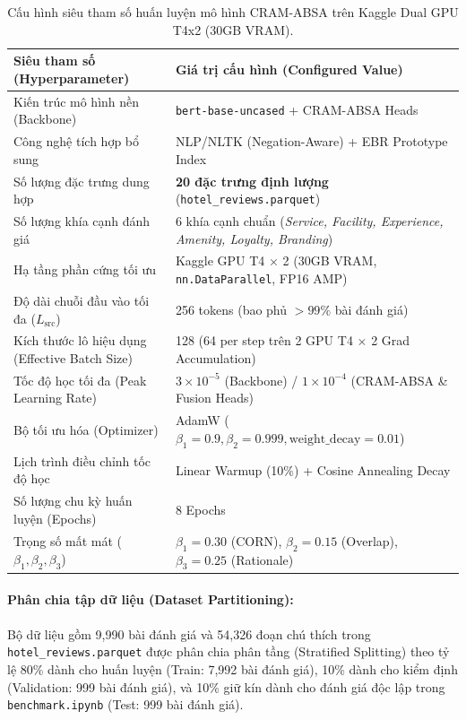 \documentclass[pdflatex,sn-mathphys-num]{sn-jnl}
\theoremstyle{thmstyleone}
\theoremstyle{thmstyletwo}
\theoremstyle{thmstylethree}
\begin{document}
\begin{table}[htbp]
\centering
\caption{Cấu hình siêu tham số huấn luyện mô hình CRAM-ABSA trên Kaggle Dual GPU T4x2 (30GB VRAM).}
\label{tab:hyperparameters}
\begin{tabular}{p{}p{}}
\hline
\textbf{Siêu tham số (Hyperparameter)} & \textbf{Giá trị cấu hình (Configured Value)} \\
\hline
Kiến trúc mô hình nền (Backbone) & \texttt{bert-base-uncased} + CRAM-ABSA Heads \\
Công nghệ tích hợp bổ sung & NLP/NLTK (Negation-Aware) + EBR Prototype Index \\
Số lượng đặc trưng dung hợp & \textbf{20 đặc trưng định lượng} (\texttt{hotel\_reviews.parquet}) \\
Số lượng khía cạnh đánh giá & 6 khía cạnh chuẩn (\textit{Service, Facility, Experience, Amenity, Loyalty, Branding}) \\
 Hạ tầng phần cứng tối ưu & Kaggle GPU T4 $\times$ 2 (30GB VRAM, \texttt{nn.DataParallel}, FP16 AMP) \\
Độ dài chuỗi đầu vào tối đa ($L_{\text{src}}$) & 256 tokens (bao phủ $>99\%$ bài đánh giá) \\
Kích thước lô hiệu dụng (Effective Batch Size) & 128 (64 per step trên 2 GPU T4 $\times$ 2 Grad Accumulation) \\
Tốc độ học tối đa (Peak Learning Rate) & $3 \times 10^{-5}$ (Backbone) / $1 \times 10^{-4}$ (CRAM-ABSA \& Fusion Heads) \\
Bộ tối ưu hóa (Optimizer) & AdamW ($\beta_1=0.9, \beta_2=0.999, \text{weight\_decay}=0.01$) \\
Lịch trình điều chỉnh tốc độ học & Linear Warmup (10\%) + Cosine Annealing Decay \\
Số lượng chu kỳ huấn luyện (Epochs) & 8 Epochs \\
Trọng số mất mát ($\beta_1, \beta_2, \beta_3$) & $\beta_1 = 0.30$ (CORN), $\beta_2 = 0.15$ (Overlap), $\beta_3 = 0.25$ (Rationale) \\
\hline
\end{tabular}
\end{table}

\paragraph{Phân chia tập dữ liệu (Dataset Partitioning):}
Bộ dữ liệu gồm 9,990 bài đánh giá và 54,326 đoạn chú thích trong \texttt{hotel\_reviews.parquet} được phân chia phân tầng (Stratified Splitting) theo tỷ lệ 80\% dành cho huấn luyện (Train: 7,992 bài đánh giá), 10\% dành cho kiểm định (Validation: 999 bài đánh giá), và 10\% giữ kín dành cho đánh giá độc lập trong \texttt{benchmark.ipynb} (Test: 999 bài đánh giá).
\end{document}
